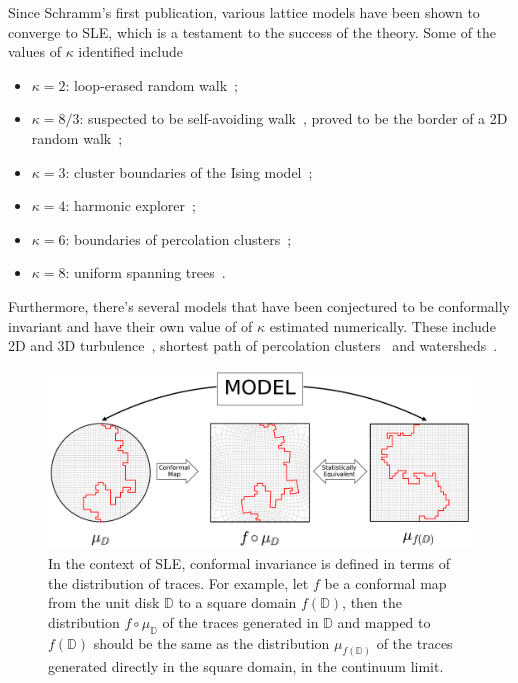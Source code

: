 Since Schramm's first publication, various lattice models have been shown to
converge to SLE, which is a testament to the success of the theory. Some of the
values of $\kappa$ identified include
\begin{itemize}
    \item $\kappa=2$: loop-erased random walk~\cite{Schramm2000};
    \item $\kappa=8/3$: suspected to be self-avoiding walk~\cite{Kennedy2002},
        proved to be the border of a 2D random walk~\cite{Lawler2001};
    \item $\kappa=3$: cluster boundaries of the Ising model~\cite{Chelkak2014};
    \item $\kappa=4$: harmonic explorer~\cite{Schramm2005};
    \item $\kappa=6$: boundaries of percolation clusters~\cite{Smirnov2001b};
    \item $\kappa=8$: uniform spanning trees~\cite{Schramm2000}.
\end{itemize}
Furthermore, there's several models that have been conjectured to be
conformally invariant and have their own value of of $\kappa$ estimated
numerically. These include 2D and 3D turbulence~\cite{Bernard2006,
Thalabard2011}, shortest path of percolation clusters~\cite{Pose2014} and
watersheds~\cite{Daryaei2012}.

\begin{figure}
\begin{center}
    \includegraphics[width=\textwidth]{chapters/ch4-sle/figs/sle_confinv}
\end{center}
\caption{In the context of SLE, conformal invariance is defined in terms of the
    distribution of traces. For example, let $f$ be a conformal map from the
    unit disk $\mathbb{D}$ to a square domain $f(\mathbb{D})$, then the
    distribution $f\circ\mu_\mathbb{D}$ of the traces generated in $\mathbb{D}$
    and mapped to $f(\mathbb{D})$ should be the same as the distribution
    $\mu_{f(\mathbb{D})}$ of the traces generated directly in the square
    domain, in the continuum limit.}
\label{fig:confinv}
\end{figure}

